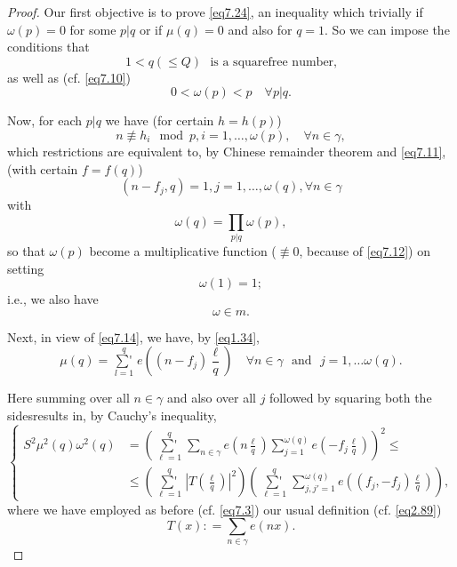 \begin{proof}
Our first objective is to prove \eqref{eq7.24}, an inequality which
trivially if $\omega(p) = 0$ for some $p|q$ or if $\mu (q) = 0$ and
also for $q=1$. So we can impose the conditions that 
\begin{equation}
1<q(\leq Q) \text{~ is a squarefree number,} \tag{7.11}\label{eq7.11}
\end{equation}
as well as (cf. \eqref{eq7.10})
\begin{equation}
0 < \omega (p) < p\quad \forall p|q.\tag{7.12}\label{eq7.12}
\end{equation}

Now, for each $p|q$ we have (for certain $h=h(p)$)
\begin{equation}
n \not\equiv h_i \mod p,i =1, \ldots ,\omega (p),\quad \forall n
\in \gamma, \tag{7.13}\label{eq7.13} 
\end{equation}
which restrictions are equivalent to, by Chinese remainder theorem and
\eqref{eq7.11}, (with certain $f=f(q)$) 
\begin{equation}
(n-f_j,q)=1,  j=1, \ldots , \omega (q), \forall n \in \gamma
  \tag{7.14}\label{eq7.14} 
\end{equation}
with
\begin{equation}
\omega (q)=\prod_{p|q}\omega (p), \tag{7.15}\label{eq7.15}
\end{equation}
so that $\omega(p)$ become a multiplicative function ($\nequiv 0$,
because of \eqref{eq7.12}) on setting 
\begin{equation}
\omega (1) = 1 ; \tag{7.16}\label{eq7.16} 
\end{equation}
i.e., we also have
\begin{equation}
\omega \in m. \tag{7.17}\label{eq7.17}
\end{equation}

Next, in view of \eqref{eq7.14}, we have, by \eqref{eq1.34},
\begin{equation}
\mu (q) = \mathop{\sum{}'}\limits^{q}_{l = 1} e((n-f_j)
\frac{\ell}{q})\quad \forall n\in 
\gamma \text{~ and~ } j=1, \ldots \omega (q). \tag{7.18}\label{eq7.18} 
\end{equation}

Here summing over all $n \in \gamma$ and also over all $j$ followed by
squaring both the sides\pageoriginale results in, by Cauchy's
inequality, 
\begin{equation}
\begin{cases}
S^2 \mu^2 (q) \omega^2 (q) &= (\mathop{\sum{}'}\limits^{q}_{\ell=1}
\sum\limits_{n \in \gamma} e (n \frac{\ell}{q}) \sum \limits^{\omega
  (q)}_{j=1} e(-f_j \frac{\ell}{q}))^2 \leq \\  
&\leq (\mathop{\sum{}'}\limits^{q}_{\ell =1}|T(\frac{\ell}{q})|^2)
(\mathop{\sum{}'}\limits^{q}_{\ell =1} \sum \limits^{\omega (q)}_{j,
  j'=1} e((f_j,-f_j)\frac{\ell}{q})), 
\end{cases} \tag{7.19}\label{eq7.19} 
\end{equation}
where we have employed as before (cf. \eqref{eq7.3}) our usual
definition (cf. \eqref{eq2.89}) 
\begin{equation}
T(x): = \sum_{n \in \gamma} e(nx). \tag{7.20} \label{eq7.20}
\end{equation}


\end{proof}
